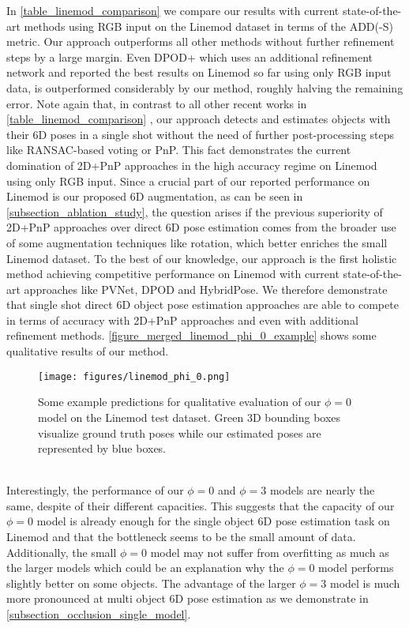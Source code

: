 \documentclass[twocolumn, 10pt, letterpaper]{article}
\begin{document}
In \autoref{table_linemod_comparison} we compare our results with current state-of-the-art methods using RGB input on the Linemod dataset in terms of the ADD(-S) metric. Our approach outperforms all other methods without further refinement steps by a large margin. Even DPOD+ which uses an additional refinement network and reported the best results on Linemod so far using only RGB input data, is outperformed considerably by our method, roughly halving the remaining error. Note again that, in contrast to all other recent works in \autoref{table_linemod_comparison} \cite{YOLO6D}\cite{Pix2Pose}\cite{PVNet}\cite{DPOD}\cite{CDPN}\cite{HybridPose}, our approach detects and estimates objects with their 6D poses in a single shot without the need of further post-processing steps like RANSAC-based voting or PnP. This fact demonstrates the current domination of 2D+PnP approaches in the high accuracy regime on Linemod using only RGB input. Since a crucial part of our reported performance on Linemod is our proposed 6D augmentation, as can be seen in \autoref{subsection_ablation_study}, the question arises if the previous superiority of 2D+PnP approaches over direct 6D pose estimation comes from the broader use of some augmentation techniques like rotation, which better enriches the small Linemod dataset. To the best of our knowledge, our approach is the first holistic method achieving competitive performance on Linemod with current state-of-the-art approaches like PVNet\cite{PVNet}, DPOD\cite{DPOD} and HybridPose\cite{HybridPose}. We therefore demonstrate that single shot direct 6D object pose estimation approaches are able to compete in terms of accuracy with 2D+PnP approaches and even with additional refinement methods. \autoref{figure_merged_linemod_phi_0_example} shows some qualitative results of our method.
\begin{figure}[h]
\texttt{[image: figures/linemod\_phi\_0.png]}
\caption{Some example predictions for qualitative evaluation of our $\phi = 0$ model on the Linemod test dataset. Green 3D bounding boxes visualize ground truth poses while our estimated poses are represented by blue boxes.}
\label{figure_merged_linemod_phi_0_example}
\end{figure}\\
Interestingly, the performance of our $\phi = 0$ and $\phi = 3$ models are nearly the same, despite of their different capacities. This suggests that the capacity of our $\phi = 0$ model is already enough for the single object 6D pose estimation task on Linemod and that the bottleneck seems to be the small amount of data. Additionally, the small $\phi = 0$ model may not suffer from overfitting as much as the larger models which could be an explanation why the $\phi = 0$ model performs slightly better on some objects. The advantage of the larger $\phi = 3$ model is much more pronounced at multi object 6D pose estimation as we demonstrate in \autoref{subsection_occlusion_single_model}.
\end{document}
